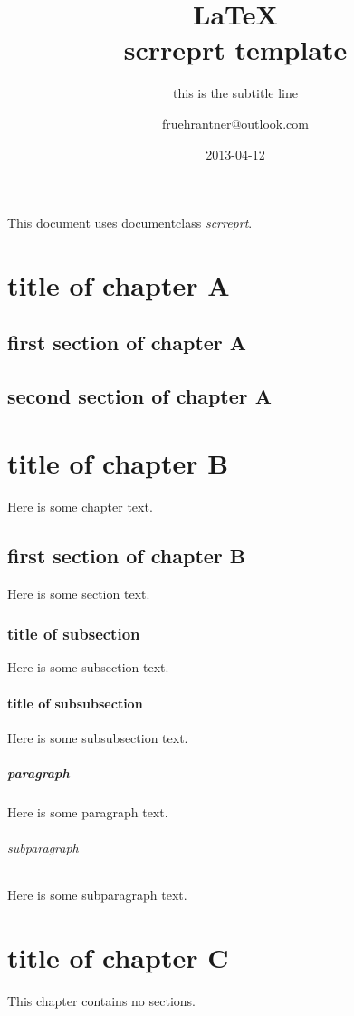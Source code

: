 \documentclass[fontsize=10pt]{scrreprt}
\begin{document}
\title{\LaTeX\\scrreprt template}
\subtitle{this is the subtitle line}
\author{fruehrantner@outlook.com}
\date{2013-04-12}
\publishers{Rantner \& Rantner Publishing}
\maketitle

This document uses documentclass \textit{scrreprt}.

\tableofcontents

\chapter{title of chapter A}
\section{first section of chapter A}
\section{second section of chapter A}

\chapter{title of chapter B}
Here is some chapter text.
\section{first section of chapter B}
Here is some section text.
\subsection{title of subsection}
Here is some subsection text.
\subsubsection{title of subsubsection}
Here is some subsubsection text.
\paragraph{paragraph}
Here is some paragraph text.
\subparagraph{subparagraph}
Here is some subparagraph text.

\chapter{title of chapter C}
This chapter contains no sections.
\end{document}
